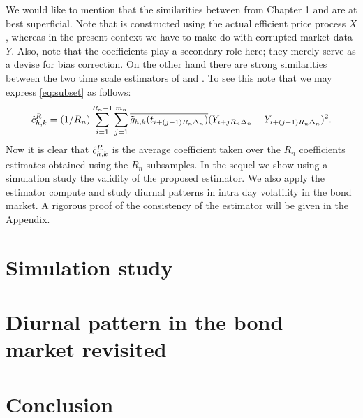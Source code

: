 We would like to mention that the similarities between \svn from Chapter 1 and \svnb are at best superficial. Note that \svn is constructed using the actual efficient price process $X$, whereas in the present context we have to make do with corrupted market data $Y$. Also, note that the coefficients \cnhk play a secondary role here; they merely serve as a devise for bias correction. On the other hand there are strong similarities between the two time scale estimators of \cite{Zhang2005} and \cite{Zu2014}. To see this note that we may express \eqref{eq:subset} as follows:
\begin{align}
  \hat{c}_{h,k}^R = (1/R_n) \sum_{i=1}^{R_n -1} \sum_{j =1}^{m_n} \overline{\tilde{g}_{h,k}(t_{i+ (j-1)R_n\Delta_n})}(Y_{i+ jR_n\Delta_n}-Y_{i+ (j-1)R_n\Delta_n})^2. \notag 
  \label{}
\end{align}
Now it is clear that $\hat{c}_{h,k}^R$ is the average coefficient taken over the $R_n$  coefficients estimates obtained using the $R_n$ subsamples. In the sequel we show using a simulation study the validity of the proposed estimator. We also apply the estimator compute and study diurnal patterns in intra day volatility in the bond market.  A rigorous proof of the consistency of the estimator will be given in the Appendix.
\section{Simulation study} \label{sec:simulation2}
\section{Diurnal pattern in the bond market revisited}\label{sec:empirics2}
\section{Conclusion}\label{sec:conclusion2}
